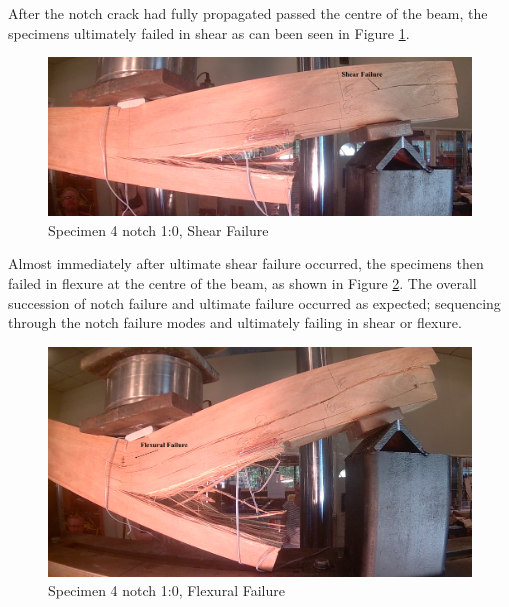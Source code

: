 \documentclass[11pt,a4paper]{article}
\numberwithin{equation}{subsection}
\begin{document}
\noindent
After the notch crack had fully propagated passed the centre of the beam, the specimens ultimately failed in shear as can been seen in Figure \ref{fig:Rect_Shear}. 

\vspace*{\baselineskip}

\begin{figure}[h]
	\begin{center}
		\includegraphics[scale=0.31]{Rect_Shear}
	\end{center}
	\caption{Specimen 4 notch 1:0, Shear Failure}
	\label{fig:Rect_Shear}
\end{figure}

\noindent
Almost immediately after ultimate shear failure occurred, the specimens then failed in flexure at the centre of the beam, as shown in Figure \ref{fig:Rect_Flex}. The overall succession of notch failure and ultimate failure occurred as expected; sequencing through the notch failure modes and ultimately failing in shear or flexure. 

\vspace*{\baselineskip}

\begin{figure}[h]
	\begin{center}
		\includegraphics[scale=0.3]{Rect_Flexure}
	\end{center}
	\caption{Specimen 4 notch 1:0, Flexural Failure}
	\label{fig:Rect_Flex}
\end{figure}
\pagebreak
\end{document}
